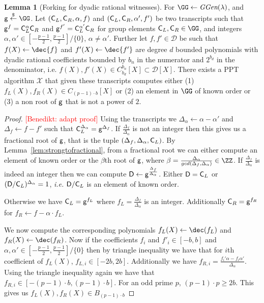 \documentclass{article}
\theoremstyle{definition}
\newtheorem{lemma}{Lemma}
\newcommand{\benedikt}[1]{{\textcolor{red}{[Benedikt: #1]}}}
\newcommand{\benedikt}[1]{}
\begin{document}
\begin{lemma}[Forking for dyadic rational witnesses]
	For $\GG \gets \ggen(\lambda)$, and $\gr{g}\sample \GG$. 
	Let $(\mathsf{C}_L,\mathsf{C}_R,\alpha,f)$ and  $(\mathsf{C}_L,\mathsf{C}_R,\alpha',f')$ be two transcripts such that $\mathsf{g}^{f}=\mathsf{C}_L^{\alpha}\mathsf{C}_R$ and $\mathsf{g}^{f'}=\mathsf{C}_L^{\alpha'}\mathsf{C}_R$ for group elements $\gr{C}_L,\gr{C}_R \in \GG$, and integers $\alpha,\alpha' \in  [-\frac{p-1}{2},\frac{p-1}{2}]/\{0\}$, $\alpha\neq \alpha'$. Further let $f,f'\in \mathcal{D}$ be such that $f(X)\gets\dec{f}$ and $f'(X)\gets\dec{f'}$ are degree $d$ bounded polynomials with dyadic rational coefficients bounded by $b_n$ in the numerator and $2^{b_d}$ in the denominator, i.e. $f(X),f'(X)\in C_{b_d}^{b_n}[X]\subset \mathcal{D}[X]$.
	 There exists a PPT algorithm $\mathcal{X}$ that given these transcripts computes either (1) $f_L(X),f_R(X)\in C_{(p-1) \cdot b}[X]$ or (2) an element in $\GG$ of known order or (3) a non root of $\mathsf{g}$ that is not a power of $2$.
\end{lemma}
\begin{proof}
\benedikt{adapt proof}
	Using the transcripts we $\Delta_\alpha\gets\alpha-\alpha'$ and $\Delta_f\gets f-f'$ such that $\mathsf{C}_{L}^{\Delta_\alpha}=\mathsf{g}^{\Delta_f}$. 
 If $\frac{\Delta_f}{\Delta_\alpha}$ is not an integer then this gives us a fractional root of $\mathsf{g}$, that is the tuple $(\Delta_f,\Delta_\alpha,\mathsf{C}_{L})$. By Lemma~\ref{lem:strongtofractional}, from a fractional root we can either compute an element of known order or the $\beta$th root of $\mathsf{g}$, where $\beta = \frac{\Delta_\alpha}{gcd(\Delta_f,\Delta_\alpha)}\in \ZZ$.  
 If $\frac{\Delta_f}{\Delta_\alpha}$ is indeed an integer then we can compute $\mathsf{D}\gets\mathsf{g}^{\frac{\Delta_f}{\Delta_\alpha}}$. Either $\mathsf{D}=\mathsf{C}_{L}$ or $(\mathsf{D}/\mathsf{C}_{L})^{\Delta_\alpha}=1$, \emph{i.e.} $\mathsf{D}/\mathsf{C}_{L}$ is an element of known order.
  
  Otherwise we have $\mathsf{C}_{L}=\mathsf{g}^{f_L}$ where $f_L=\frac{\Delta_f}{\Delta_\alpha}$ is an integer.
Additionally $\mathsf{C}_R=\mathsf{g}^{f_R}$ for $f_R\gets f-\alpha \cdot f_L$.  

We now compute the corresponding polynomials $f_L(X)\gets \dec(f_L)$ and $f_R(X)\gets \dec(f_R)$.
Now if the coefficients $f_i$ and $f'_i\in [-b,b]$ and $\alpha,\alpha' \in [-\frac{p-1}{2},\frac{p-1}{2}]/\{0\}$ then by triangle inequality we have that for $i$th coefficient of $f_L(X)$, $f_{L,i}\in [-2b,2b]$. Additionally we have $f_{R,i}=\frac{f_i'\alpha-f_i \alpha'}{\Delta_\alpha}$. Using the triangle inequality again we have that $f_{R,i} \in [-(p-1) \cdot b, (p-1) \cdot b]$. For an odd prime $p$, $(p-1)\cdot p\geq 2b$. This gives us $f_L(X),f_R(X)\in B_{(p-1) \cdot b}$
\end{proof}
\end{document}

